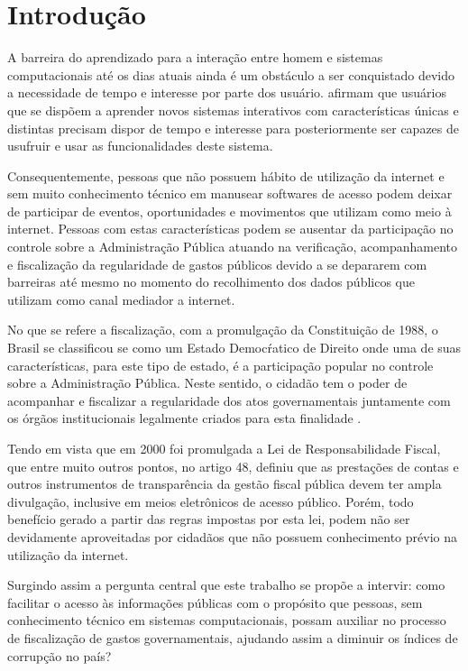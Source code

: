 \chapter{Introdução}
A barreira do aprendizado para a interação entre homem e sistemas computacionais até os dias atuais ainda é um obstáculo a ser conquistado devido a necessidade de tempo e interesse por parte dos usuário. \cite{Barbosa:2010} afirmam que usuários que se dispõem a aprender novos sistemas interativos com características únicas e distintas precisam dispor de tempo e interesse para posteriormente ser capazes de usufruir e usar as funcionalidades deste sistema.

Consequentemente, pessoas que não possuem hábito de utilização da internet e sem muito conhecimento técnico em manusear softwares de acesso podem deixar de participar de eventos, oportunidades e movimentos que utilizam como meio à internet. Pessoas com estas características podem se ausentar da participação no controle sobre a Administração Pública atuando na verificação, acompanhamento e fiscalização da regularidade de gastos públicos devido a se depararem com barreiras até mesmo no momento do recolhimento dos dados públicos que utilizam como canal mediador a internet.

No que se refere a fiscalização, com a promulgação da Constituição de 1988, o Brasil se classificou se como um Estado Democŕatico de Direito onde uma de suas características, para este tipo de estado, é a participação popular no controle sobre a Administração Pública. Neste sentido, o cidadão tem o poder de acompanhar e fiscalizar a regularidade dos atos governamentais juntamente com os órgãos institucionais legalmente criados para esta finalidade \cite{Arruda:2010}.

Tendo em vista que em 2000 foi promulgada a Lei de Responsabilidade Fiscal, que entre muito outros pontos, no artigo 48, definiu que as prestações de contas e outros instrumentos de transparência da gestão fiscal pública devem ter ampla divulgação, inclusive em meios eletrônicos de acesso público. Porém, todo benefício gerado a partir das regras impostas por esta lei, podem não ser devidamente aproveitadas por cidadãos que não possuem conhecimento prévio na utilização da internet.

Surgindo assim a pergunta central que este trabalho se propõe a intervir: como facilitar o acesso às informações públicas com o propósito que pessoas, sem conhecimento técnico em sistemas computacionais, possam auxiliar no processo de fiscalização de gastos governamentais, ajudando assim a diminuir os índices de corrupção no país?

